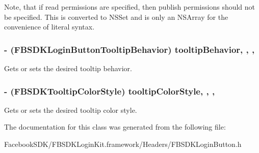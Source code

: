 Note, that if read permissions are specified, then publish permissions should not be specified. This is converted to N\-S\-Set and is only an N\-S\-Array for the convenience of literal syntax. \hypertarget{interface_f_b_s_d_k_login_button_ad8da738c3ec8c6efbdada9547ef09757}{
\subsubsection[{tooltip\-Behavior}]{\setlength{\rightskip}{0pt plus 5cm}-\/ (F\-B\-S\-D\-K\-Login\-Button\-Tooltip\-Behavior) tooltip\-Behavior\hspace{0.3cm}{\ttfamily [read]}, {\ttfamily [write]}, {\ttfamily [nonatomic]}, {\ttfamily [assign]}}}\label{interface_f_b_s_d_k_login_button_ad8da738c3ec8c6efbdada9547ef09757}
Gets or sets the desired tooltip behavior. \hypertarget{interface_f_b_s_d_k_login_button_af2e1aa50591714452427fc87eade3e5e}{
\subsubsection[{tooltip\-Color\-Style}]{\setlength{\rightskip}{0pt plus 5cm}-\/ (F\-B\-S\-D\-K\-Tooltip\-Color\-Style) tooltip\-Color\-Style\hspace{0.3cm}{\ttfamily [read]}, {\ttfamily [write]}, {\ttfamily [nonatomic]}, {\ttfamily [assign]}}}\label{interface_f_b_s_d_k_login_button_af2e1aa50591714452427fc87eade3e5e}
Gets or sets the desired tooltip color style. 

The documentation for this class was generated from the following file\-:\begin{DoxyCompactItemize}
\item 
Facebook\-S\-D\-K/\-F\-B\-S\-D\-K\-Login\-Kit.\-framework/\-Headers/F\-B\-S\-D\-K\-Login\-Button.\-h\end{DoxyCompactItemize}
